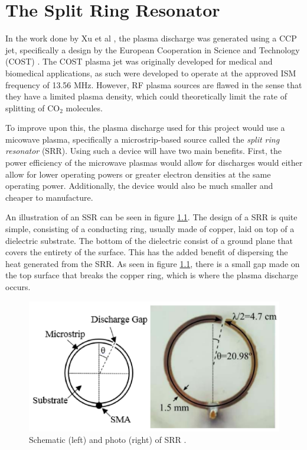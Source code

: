 \chapter{The Split Ring Resonator}


In the work done by Xu et al \cite{Xu2021}, the plasma discharge was generated using a CCP jet, specifically a design by the European Cooperation in Science and Technology (COST) \cite{Gorbanev2019}. The COST plasma jet was originally developed for medical and biomedical applications, as such were developed to operate at the approved ISM frequency of 13.56 MHz. However, RF plasma sources are flawed in the sense that they have a limited plasma density, which could theoretically limit the rate of splitting of CO$_2$ molecules.

To improve upon this, the plasma discharge used for this project would use a micowave plasma, specifically a microstrip-based source called the \textit{split ring resonator} (SRR). Using such a device will have two main benefits. First, the power efficiency of the microwave plasmas would allow for discharges would either allow for lower operating powers or greater electron densities at the same operating power. Additionally, the device would also be much smaller and cheaper to manufacture.

An illustration of an SSR can be seen in figure \ref{fig:SRR}. The design of a SRR is quite simple, consisting of a conducting ring, usually made of copper, laid on top of a dielectric substrate. The bottom of the dielectric consist of a ground plane that covers the entirety of the surface. This has the added benefit of dispersing the heat generated from the SRR. As seen in figure \ref{fig:SRR}, there is a small gap made on the top surface that breaks the copper ring, which is where the plasma discharge occurs. 


\begin{figure}[h!]
	\centering
	\includegraphics[width=0.7\linewidth]{chapter_4/figures/split_ring_resonator.png}
	\caption{Schematic (left) and photo (right) of SRR \cite{Dextre2017}.}
	\label{fig:SRR}
\end{figure}

